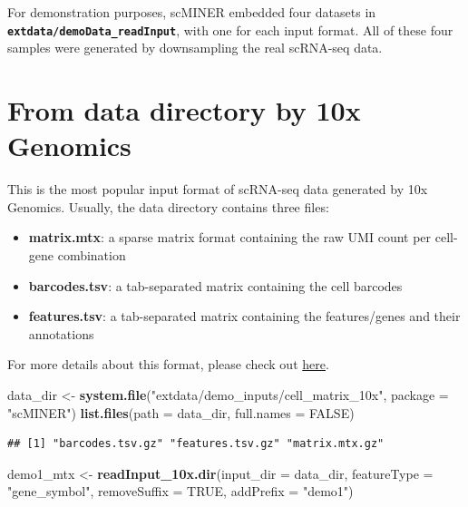 \documentclass[
  12pt,
]{book}
\newenvironment{Shaded}{\begin{snugshade}}{\end{snugshade}}
\newcommand{\AttributeTok}[1]{\textcolor[rgb]{0.13,0.29,0.53}{#1}}
\newcommand{\ConstantTok}[1]{\textcolor[rgb]{0.56,0.35,0.01}{#1}}
\newcommand{\FunctionTok}[1]{\textcolor[rgb]{0.13,0.29,0.53}{\textbf{#1}}}
\newcommand{\NormalTok}[1]{#1}
\newcommand{\OtherTok}[1]{\textcolor[rgb]{0.56,0.35,0.01}{#1}}
\newcommand{\StringTok}[1]{\textcolor[rgb]{0.31,0.60,0.02}{#1}}
\providecommand{\tightlist}{%
  \setlength{\itemsep}{0pt}\setlength{\parskip}{0pt}}
\begin{document}
For demonstration purposes, scMINER embedded four datasets in \textbf{\texttt{extdata/demoData\_readInput}}, with one for each input format. All of these four samples were generated by downsampling the real scRNA-seq data.

\section{From data directory by 10x Genomics}\label{from-data-directory-by-10x-genomics}

This is the most popular input format of scRNA-seq data generated by 10x Genomics. Usually, the data directory contains three files:

\begin{itemize}
\tightlist
\item
  \textbf{matrix.mtx}: a sparse matrix format containing the raw UMI count per cell-gene combination
\item
  \textbf{barcodes.tsv}: a tab-separated matrix containing the cell barcodes
\item
  \textbf{features.tsv}: a tab-separated matrix containing the features/genes and their annotations
\end{itemize}

For more details about this format, please check out \href{https://www.10xgenomics.com/support/software/cell-ranger/latest/analysis/outputs/cr-outputs-mex-matrices}{here}.

\begin{Shaded}
\begin{Highlighting}[]
\NormalTok{data\_dir }\OtherTok{\textless{}{-}} \FunctionTok{system.file}\NormalTok{(}\StringTok{"extdata/demo\_inputs/cell\_matrix\_10x"}\NormalTok{, }\AttributeTok{package =} \StringTok{"scMINER"}\NormalTok{)}
\FunctionTok{list.files}\NormalTok{(}\AttributeTok{path =}\NormalTok{ data\_dir, }\AttributeTok{full.names =} \ConstantTok{FALSE}\NormalTok{)}
\end{Highlighting}
\end{Shaded}

\begin{verbatim}
## [1] "barcodes.tsv.gz" "features.tsv.gz" "matrix.mtx.gz"
\end{verbatim}

\begin{Shaded}
\begin{Highlighting}[]
\NormalTok{demo1\_mtx }\OtherTok{\textless{}{-}} \FunctionTok{readInput\_10x.dir}\NormalTok{(}\AttributeTok{input\_dir =}\NormalTok{ data\_dir, }\AttributeTok{featureType =} \StringTok{"gene\_symbol"}\NormalTok{, }\AttributeTok{removeSuffix =} \ConstantTok{TRUE}\NormalTok{, }\AttributeTok{addPrefix =} \StringTok{"demo1"}\NormalTok{)}
\end{Highlighting}
\end{Shaded}
\end{document}
